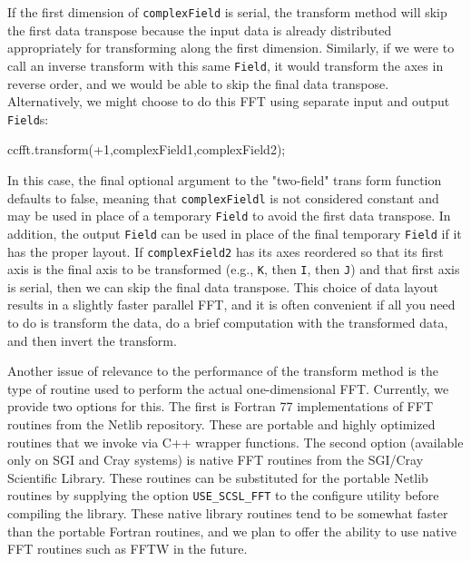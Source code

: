 If the first dimension of \texttt{complexField} is serial, the transform method will skip the first data transpose because the input data is already distributed appropriately for transforming along the first dimension. Similarly, if we were to call an inverse transform with this same \texttt{Field}, it would transform the axes in reverse order, and we would be able to skip the final data transpose. Alternatively, we might choose to do this FFT using separate input and output \texttt{Field}s:
\begin{smallcode}
ccfft.transform(+1,complexField1,complexField2); 
\end{smallcode}
In this case, the final optional argument to the "two-field" trans form function defaults to false, meaning that \texttt{complexFieldl} is not considered constant and may be used in place of a temporary \texttt{Field} to avoid the first data transpose. In addition, the output \texttt{Field} can be used in place of the final temporary \texttt{Field} if it has the proper layout. If \texttt{complexField2} has its axes reordered so that its first axis is the final axis to be transformed
(e.g., \texttt{K}, then \texttt{I}, then \texttt{J}) and that first axis is serial, then we can skip the final data transpose. This choice of data layout results in a slightly faster parallel FFT, and it is often convenient if all you need to do is transform the data, do a brief computation with the transformed data, and then invert the transform.

Another issue of relevance to the performance of the transform method is the type of routine used to perform the actual one-dimensional FFT. Currently, we provide two options for this. The first is Fortran 77 implementations of FFT routines from the Netlib repository. These are portable and highly optimized routines that we invoke via C++ wrapper functions. The second option (available only on SGI and Cray systems) is native FFT routines from the SGI/Cray Scientific Library. These routines can be substituted for the portable Netlib routines by supplying the option {\tt USE\_SCSL\_FFT} to the configure utility before compiling the \ippl library. These native library routines tend to be somewhat faster than the portable Fortran routines, and we plan to offer the ability to use native FFT routines such as FFTW in the future. 
